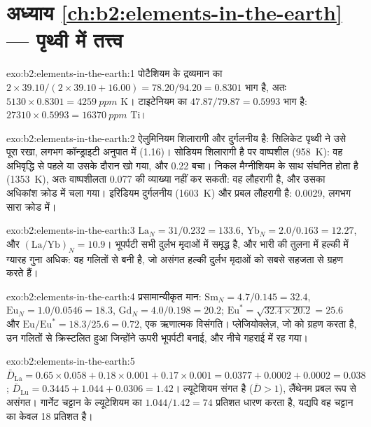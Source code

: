 \section*{अध्याय \ref{ch:b2:elements-in-the-earth} --- पृथ्वी में तत्त्व}

\begin{solution}{exo:b2:elements-in-the-earth:1}
पोटैशियम  के द्रव्यमान का $2\times39.10/(2\times39.10+16.00) = 78.20/94.20 = 0.8301$ भाग है,
अतः $\num{5130}\times0.8301 = \qty{4259}{ppm}$ K। टाइटेनियम  का
$47.87/79.87 = 0.5993$ भाग है: $\num{27310}\times0.5993 = \qty{16370}{ppm}$ Ti।
\end{solution}

\begin{solution}{exo:b2:elements-in-the-earth:2}
ऐलुमिनियम शिलारागी और दुर्गलनीय है: सिलिकेट पृथ्वी ने उसे पूरा रखा, लगभग
कॉन्ड्राइटी अनुपात में (1.16)। सोडियम शिलारागी है पर वाष्पशील (\qty{958}{K}): वह
अभिवृद्धि से पहले या उसके दौरान खो गया, और 0.22 बचा। निकल मैग्नीशियम के साथ संघनित होता है
(\qty{1353}{K}), अतः वाष्पशीलता 0.077 की व्याख्या नहीं कर सकती: वह लौहरागी है, और उसका अधिकांश
क्रोड में चला गया। इरिडियम दुर्गलनीय (\qty{1603}{K}) और प्रबल लौहरागी है:
0.0029, लगभग सारा क्रोड में।
\end{solution}

\begin{solution}{exo:b2:elements-in-the-earth:3}
$\mathrm{La}_N = 31/0.232 = 133.6$, $\mathrm{Yb}_N = 2.0/0.163 = 12.27$, और
$(\mathrm{La}/\mathrm{Yb})_N = 10.9$। भूपर्पटी सभी दुर्लभ मृदाओं में समृद्ध है, और
भारी की तुलना में हल्की में ग्यारह गुना अधिक: वह गलितों से बनी है, जो
असंगत हल्की दुर्लभ मृदाओं को सबसे सहजता से ग्रहण करते हैं।
\end{solution}

\begin{solution}{exo:b2:elements-in-the-earth:4}
प्रसामान्यीकृत मान: $\mathrm{Sm}_N = 4.7/0.145 = 32.4$, $\mathrm{Eu}_N = 1.0/0.0546 = 18.3$,
$\mathrm{Gd}_N = 4.0/0.198 = 20.2$; $\mathrm{Eu}^* = \sqrt{32.4\times20.2} = 25.6$ और
$\mathrm{Eu}/\mathrm{Eu}^* = 18.3/25.6 = 0.72$, एक ऋणात्मक विसंगति। प्लेजियोक्लेज़, जो
 को ग्रहण करता है, उन गलितों से क्रिस्टलित हुआ जिन्होंने ऊपरी भूपर्पटी बनाई, और
नीचे गहराई में रह गया।
\end{solution}

\begin{solution}{exo:b2:elements-in-the-earth:5}
$\bar D_{\mathrm{La}} = 0.65\times0.058+0.18\times0.001+0.17\times0.001 = 0.0377 +
0.0002 + 0.0002 = 0.038$; $\bar D_{\mathrm{Lu}} = 0.3445+1.044+0.0306 = 1.42$। ल्यूटेशियम
संगत है ($\bar D > 1$), लैंथेनम प्रबल रूप से असंगत। गार्नेट चट्टान के ल्यूटेशियम का
$1.044/1.42 = 74$ प्रतिशत धारण करता है, यद्यपि वह चट्टान का केवल 18 प्रतिशत
है।
\end{solution}

